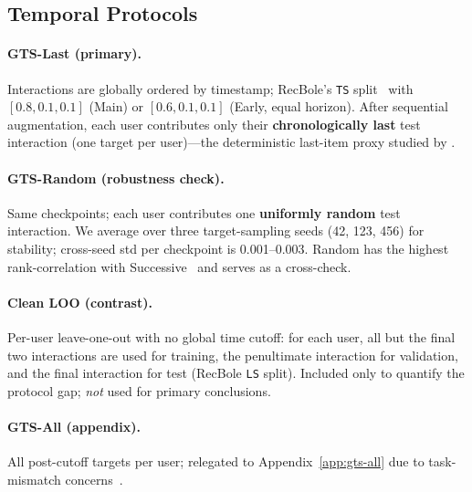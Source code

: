 \documentclass[sigconf,natbib=true,anonymous]{acmart}
\begin{document}
\subsection{Temporal Protocols}
\label{sec:protocol}

\paragraph{GTS-Last (primary).}
Interactions are globally ordered by timestamp; RecBole's \texttt{TS} split~\cite{zhao2021recbole} with $[0.8,0.1,0.1]$ (Main) or $[0.6,0.1,0.1]$ (Early, equal horizon).
After sequential augmentation, each user contributes only their \textbf{chronologically last} test interaction (one target per user)---the deterministic last-item proxy studied by \citet{gusak2025time}.

\paragraph{GTS-Random (robustness check).}
Same checkpoints; each user contributes one \textbf{uniformly random} test interaction.  We average over three target-sampling seeds (42, 123, 456) for stability; cross-seed std per checkpoint is 0.001--0.003.
Random has the highest rank-correlation with Successive~\cite{gusak2025time} and serves as a cross-check.

\paragraph{Clean LOO (contrast).}
Per-user leave-one-out with no global time cutoff: for each user, all but the final two interactions are used for training, the penultimate interaction for validation, and the final interaction for test (RecBole \texttt{LS} split).
Included only to quantify the protocol gap; \emph{not} used for primary conclusions.

\paragraph{GTS-All (appendix).}
All post-cutoff targets per user; relegated to Appendix~\ref{app:gts-all} due to task-mismatch concerns~\cite{gusak2025time}.
\end{document}
